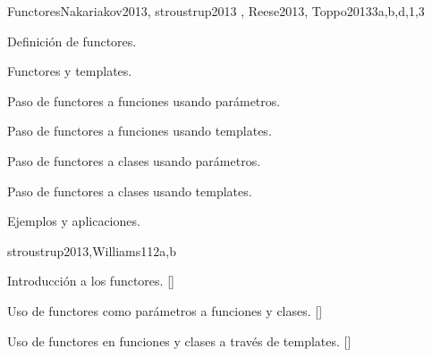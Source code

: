 \begin{syllabus}
\begin{unit}{Functores}{}{Nakariakov2013, stroustrup2013 , Reese2013, Toppo2013}{3}{a,b,d,1,3}
\begin{topics}
	\item Definición de functores.
	\item Functores y templates.
	\item Paso de functores a funciones usando parámetros.
	\item Paso de functores a funciones usando templates.
	\item Paso de functores a clases usando parámetros.
	\item Paso de functores a clases usando templates.
	\item Ejemplos y aplicaciones.
\end{topics}

\begin{learningoutcomes}
	
\end{learningoutcomes}
\end{unit}

\begin{unit}{\PLEventDrivenandReactiveProgramming}{}{stroustrup2013,Williams11}{2}{a,b}
\begin{topics}
	\item \PLEventDrivenandReactiveProgrammingTopicEvents
	\item \PLEventDrivenandReactiveProgrammingTopicCanonical
	\item \PLEventDrivenandReactiveProgrammingTopicUsingA
	\item \PLEventDrivenandReactiveProgrammingTopicExternally
	\item \PLEventDrivenandReactiveProgrammingTopicSeparation
\end{topics}\item Introducción a los functores. [\Usage] 
	
\begin{learningoutcomes}
	\item Uso de functores como parámetros a funciones y clases.  [\Usage]
	\item Uso de functores en funciones y clases a través de templates. [\Usage]

\end{learningoutcomes}
\end{unit}


\begin{coursebibliography}
\end{coursebibliography}

\end{syllabus}
